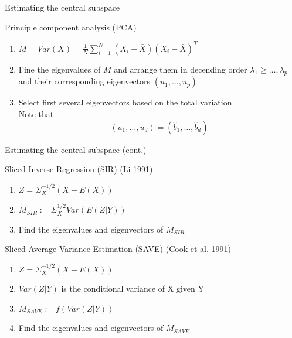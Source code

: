\documentclass[ignorenonframetext,]{beamer}
\providecommand{\tightlist}{%
  \setlength{\itemsep}{0pt}\setlength{\parskip}{0pt}}
\begin{document}
\begin{frame}{Estimating the central subspace}

\begin{block}{Principle component analysis (PCA)}

\begin{enumerate}
\def\labelenumi{\arabic{enumi}.}
\tightlist
\item
  \(M = \hat{Var}(X) = \frac{1}{N}\sum_{i = 1}^N(X_i-\bar{X})(X_i-\bar{X})^T\)\\
\item
  Fine the eigenvalues of \(M\) and arrange them in decending order
  \(\lambda_1 \geq \dots, \lambda_p\) and their corresponding
  eigenvectors \((u_1, \dots, u_p)\)\\
\item
  Select first several eigenvectors based on the total variation\\
  Note that \[
  (u_1, \dots, u_d) = (\hat{b}_1, \dots, \hat{b}_d)
  \]
\end{enumerate}

\end{block}

\end{frame}

\begin{frame}{Estimating the central subspace (cont.)}

\begin{block}{Sliced Inverse Regression (SIR) (Li 1991)}

\begin{enumerate}
\def\labelenumi{\arabic{enumi}.}
\tightlist
\item
  \(Z = \Sigma_X^{-1/2}(X - E(X))\)
\item
  \(M_{SIR} := \Sigma_X^{1/2}Var(E(Z|Y))\)
\item
  Find the eigenvalues and eigenvectors of \(M_{SIR}\)
\end{enumerate}

\end{block}

\begin{block}{Sliced Average Variance Estimation (SAVE) (Cook et al.
1991)}

\begin{enumerate}
\def\labelenumi{\arabic{enumi}.}
\tightlist
\item
  \(Z = \Sigma_X^{-1/2}(X - E(X))\)
\item
  \(Var(Z|Y)\) is the conditional variance of X given Y
\item
  \(M_{SAVE} := f(Var(Z|Y))\)
\item
  Find the eigenvalues and eigenvectors of \(M_{SAVE}\)
\end{enumerate}

\end{block}

\end{frame}
\end{document}
